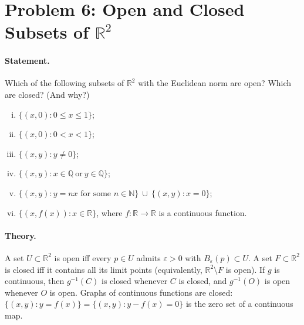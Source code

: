 \documentclass[12pt,a4paper]{article}
\theoremstyle{plain}
\theoremstyle{definition}
\theoremstyle{remark}
\theoremstyle{remark}
\begin{document}
\section*{Problem 6: Open and Closed Subsets of $\mathbb{R}^2$}

\paragraph{Statement.}
Which of the following subsets of $\mathbb{R}^2$ with the Euclidean norm are open? Which are closed? (And why?)
\begin{enumerate}[(i)]
	\item $\{(x,0): 0\le x\le 1\}$;
	\item $\{(x,0): 0< x< 1\}$;
	\item $\{(x,y): y\ne 0\}$;
	\item $\{(x,y): x\in\mathbb{Q}\ \text{or}\ y\in\mathbb{Q}\}$;
	\item $\{(x,y): y=nx \text{ for some } n\in\mathbb{N}\}\ \cup\ \{(x,y): x=0\}$;
	\item $\{(x,f(x)) : x\in\mathbb{R}\}$, where $f:\mathbb{R}\to\mathbb{R}$ is a continuous function.
\end{enumerate}

\paragraph{Theory.}
A set $U\subset\mathbb{R}^2$ is open iff every $p\in U$ admits $\varepsilon>0$ with $B_\varepsilon(p)\subset U$.
A set $F\subset\mathbb{R}^2$ is closed iff it contains all its limit points (equivalently, $\mathbb{R}^2\setminus F$ is open).
If $g$ is continuous, then $g^{-1}(C)$ is closed whenever $C$ is closed, and $g^{-1}(O)$ is open whenever $O$ is open.
Graphs of continuous functions are closed: $\{(x,y): y=f(x)\}=\{(x,y): y-f(x)=0\}$ is the zero set of a continuous map.
\end{document}
